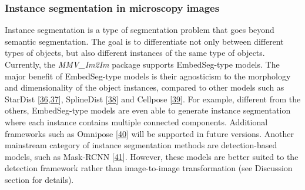 \hypertarget{instance-segmentation-in-microscopy-images}{%
\subsubsection{Instance segmentation in microscopy images}\label{instance-segmentation-in-microscopy-images}}

Instance segmentation is a type of segmentation problem that goes beyond semantic segmentation. The goal is to differentiate not only between different types of objects, but also different instances of the same type of objects. Currently, the \emph{MMV\_Im2Im} package supports EmbedSeg-type models. The major benefit of EmbedSeg-type models is their agnosticism to the morphology and dimensionality of the object instances, compared to other models such as StarDist {[}\protect\hyperlink{ref-tIIG2f8K}{36},\protect\hyperlink{ref-14h90Vfg0}{37}{]}, SplineDist {[}\protect\hyperlink{ref-17Yrl6WGQ}{38}{]} and Cellpose {[}\protect\hyperlink{ref-TugPkOLy}{39}{]}. For example, different from the others, EmbedSeg-type models are even able to generate instance segmentation where each instance contains multiple connected components. Additional frameworks such as Omnipose {[}\protect\hyperlink{ref-lXzmjM5n}{40}{]} will be supported in future versions. Another mainstream category of instance segmentation methods are detection-based models, such as Mask-RCNN {[}\protect\hyperlink{ref-xi8wnibR}{41}{]}. However, these models are better suited to the detection framework rather than image-to-image transformation (see Discussion section for details).

